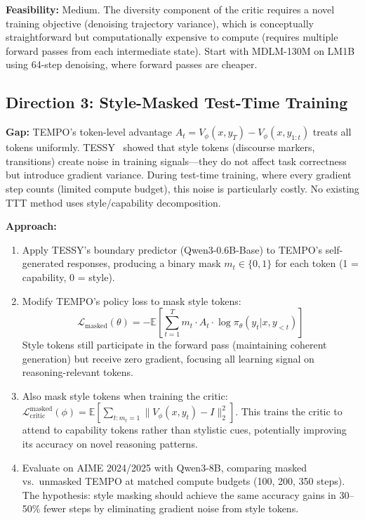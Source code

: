 \documentclass[11pt]{article}
\begin{document}
\textbf{Feasibility:} Medium. The diversity component of the critic requires a novel training objective (denoising trajectory variance), which is conceptually straightforward but computationally expensive to compute (requires multiple forward passes from each intermediate state). Start with MDLM-130M on LM1B using 64-step denoising, where forward passes are cheaper.

\subsection{Direction 3: Style-Masked Test-Time Training}

\textbf{Gap:} TEMPO's token-level advantage $A_t = V_\phi(x, y_T) - V_\phi(x, y_{1:t})$ treats all tokens uniformly. TESSY~\cite{tessy} showed that style tokens (discourse markers, transitions) create noise in training signals---they do not affect task correctness but introduce gradient variance. During test-time training, where every gradient step counts (limited compute budget), this noise is particularly costly. No existing TTT method uses style/capability decomposition.

\textbf{Approach:}
\begin{enumerate}
    \item Apply TESSY's boundary predictor (Qwen3-0.6B-Base) to TEMPO's self-generated responses, producing a binary mask $m_t \in \{0, 1\}$ for each token (1 = capability, 0 = style).

    \item Modify TEMPO's policy loss to mask style tokens:
    \begin{equation}
        \mathcal{L}_{\mathrm{masked}}(\theta) = -\mathbb{E}\!\left[\sum_{t=1}^{T} m_t \cdot A_t \cdot \log \pi_\theta(y_t | x, y_{<t})\right]
    \end{equation}
    Style tokens still participate in the forward pass (maintaining coherent generation) but receive zero gradient, focusing all learning signal on reasoning-relevant tokens.

    \item Also mask style tokens when training the critic: $\mathcal{L}_{\mathrm{critic}}^{\mathrm{masked}}(\phi) = \mathbb{E}\!\left[\sum_{t: m_t=1} \|V_\phi(x, y_t) - I\|_2^2\right]$. This trains the critic to attend to capability tokens rather than stylistic cues, potentially improving its accuracy on novel reasoning patterns.

    \item Evaluate on AIME 2024/2025 with Qwen3-8B, comparing masked vs.\ unmasked TEMPO at matched compute budgets (100, 200, 350 steps). The hypothesis: style masking should achieve the same accuracy gains in 30--50\% fewer steps by eliminating gradient noise from style tokens.
\end{enumerate}
\end{document}
